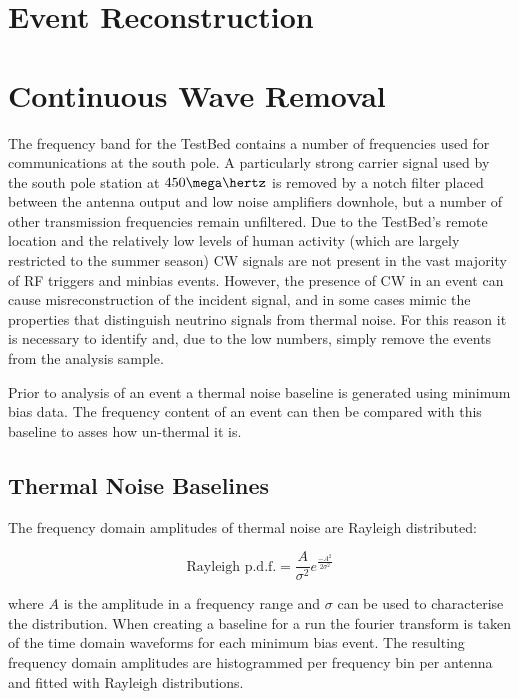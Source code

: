 \section{Event Reconstruction}
\label{sec:Analysis:Reconstruction}


\section{Continuous Wave Removal}
\label{sec:Analysis:CWRemoval}

The frequency band for the TestBed contains a number of frequencies used for communications at the south pole. A particularly strong carrier signal used by the south pole station at $450 \mega \hertz$ is removed by a notch filter placed between the antenna output and low noise amplifiers downhole, but a number of other transmission frequencies remain unfiltered. Due to the TestBed's remote location and the relatively low levels of human activity (which are largely restricted to the summer season) CW signals are not present in the vast majority of RF triggers and minbias events. However, the presence of CW in an event can cause misreconstruction of the incident signal, and in some cases mimic the properties that distinguish neutrino signals from thermal noise. For this reason it is necessary to identify and, due to the low numbers, simply remove the events from the analysis sample.

Prior to analysis of an event a thermal noise baseline is generated using minimum bias data. The frequency content of an event can then be compared with this baseline to asses how un-thermal it is. 

\subsection{Thermal Noise Baselines}
\label{sec:Analysis:CWRemoval:Baselines}

The frequency domain amplitudes of thermal noise are Rayleigh distributed:

\begin{equation}
  \mbox{Rayleigh p.d.f.} = \frac{A}{\sigma^{2}}e^{\frac{-A^{2}}{2\sigma^{2}}}
  \label{eq:Analysis:CWRemoval:Rayleigh-pdf}
\end{equation}

\noindent where $A$ is the amplitude in a frequency range and $\sigma$ can be used to characterise the distribution. When creating a baseline for a run the fourier transform is taken of the time domain waveforms for each minimum bias event. The resulting frequency domain amplitudes are histogrammed per frequency bin per antenna and fitted with Rayleigh distributions.


